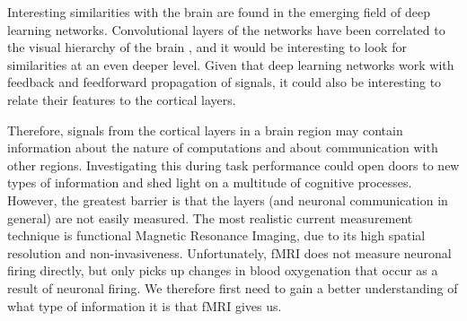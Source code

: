 Interesting similarities with the brain are found in the emerging field of deep learning networks. Convolutional layers of the networks have been correlated to the visual hierarchy of the brain \cite{Guclu2015}, and it would be interesting to look for similarities at an even deeper level. Given that deep learning networks work with feedback and feedforward propagation of signals, it could also be interesting to relate their features to the cortical layers.

Therefore, signals from the cortical layers in a brain region may contain information about the nature of computations and about communication with other regions. Investigating this during task performance could open doors to new types of information and shed light on a multitude of cognitive processes. However, the greatest barrier is that the layers (and neuronal communication in general) are not easily measured. The most realistic current measurement technique is functional Magnetic Resonance Imaging, due to its high spatial resolution and non-invasiveness. Unfortunately, fMRI does not measure neuronal firing directly, but only picks up changes in blood oxygenation that occur as a result of neuronal firing. We therefore first need to gain a better understanding of what type of information it is that fMRI gives us.

